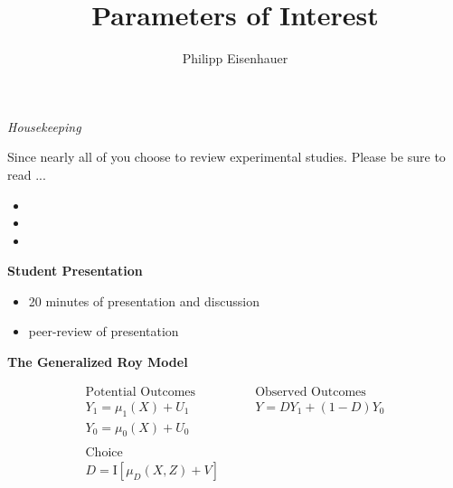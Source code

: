

\title{Parameters of Interest}
\author{Philipp Eisenhauer}

\date{}

\let\otp\titlepage


\maketitle

\begin{frame}\begin{center}
\LARGE\textit{Housekeeping}
\end{center}\end{frame}

\begin{frame}
Since nearly all of you choose to review experimental studies. Please be sure to read ...

\begin{itemize}
\item {}
\item {}
\item {}
\end{itemize}
\end{frame}

\begin{frame}
\textbf{Student Presentation}

\begin{itemize}
\item 20 minutes of presentation and discussion
\item peer-review of presentation
\end{itemize}
\end{frame}




\begin{frame}
\textbf{The Generalized Roy Model}

\begin{align*}
\text{Potential Outcomes} &\qquad\text{Observed Outcomes }\\
Y_1 = \mu_1(X) + U_1      &\qquad  Y = D Y_1 + (1 - D)Y_0 \\
Y_0 = \mu_0(X) + U_0      &\qquad \\
    & \\
\text{Choice} & \\
D = \mathrm{I}[\mu_D(X, Z) + V] & \\
\end{align*}
\end{frame}


